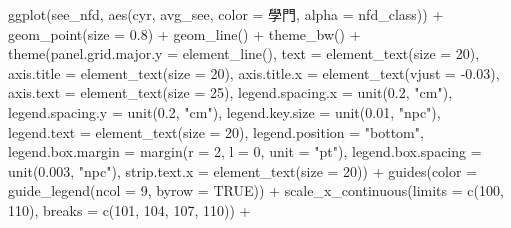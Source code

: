 \documentclass[
]{article}
\newenvironment{Shaded}{\begin{snugshade}}{\end{snugshade}}
\newcommand{\AttributeTok}[1]{\textcolor[rgb]{0.77,0.63,0.00}{#1}}
\newcommand{\ConstantTok}[1]{\textcolor[rgb]{0.00,0.00,0.00}{#1}}
\newcommand{\DecValTok}[1]{\textcolor[rgb]{0.00,0.00,0.81}{#1}}
\newcommand{\FloatTok}[1]{\textcolor[rgb]{0.00,0.00,0.81}{#1}}
\newcommand{\FunctionTok}[1]{\textcolor[rgb]{0.00,0.00,0.00}{#1}}
\newcommand{\NormalTok}[1]{#1}
\newcommand{\SpecialCharTok}[1]{\textcolor[rgb]{0.00,0.00,0.00}{#1}}
\newcommand{\StringTok}[1]{\textcolor[rgb]{0.31,0.60,0.02}{#1}}
\begin{document}
\begin{Shaded}
\begin{Highlighting}[]
  \FunctionTok{ggplot}\NormalTok{(see\_nfd, }\FunctionTok{aes}\NormalTok{(cyr, avg\_see, }\AttributeTok{color =}\NormalTok{ 學門, }\AttributeTok{alpha =}\NormalTok{ nfd\_class)) }\SpecialCharTok{+}
  \FunctionTok{geom\_point}\NormalTok{(}\AttributeTok{size =} \FloatTok{0.8}\NormalTok{) }\SpecialCharTok{+}
  \FunctionTok{geom\_line}\NormalTok{() }\SpecialCharTok{+}
  \FunctionTok{theme\_bw}\NormalTok{() }\SpecialCharTok{+}
  \FunctionTok{theme}\NormalTok{(}\AttributeTok{panel.grid.major.y =} \FunctionTok{element\_line}\NormalTok{(), }
        \AttributeTok{text =} \FunctionTok{element\_text}\NormalTok{(}\AttributeTok{size =} \DecValTok{20}\NormalTok{), }
        \AttributeTok{axis.title =} \FunctionTok{element\_text}\NormalTok{(}\AttributeTok{size =} \DecValTok{20}\NormalTok{),}
        \AttributeTok{axis.title.x =} \FunctionTok{element\_text}\NormalTok{(}\AttributeTok{vjust =} \SpecialCharTok{{-}}\FloatTok{0.03}\NormalTok{),}
        \AttributeTok{axis.text =} \FunctionTok{element\_text}\NormalTok{(}\AttributeTok{size =} \DecValTok{25}\NormalTok{),}
        \AttributeTok{legend.spacing.x =} \FunctionTok{unit}\NormalTok{(}\FloatTok{0.2}\NormalTok{, }\StringTok{"cm"}\NormalTok{),}
        \AttributeTok{legend.spacing.y =} \FunctionTok{unit}\NormalTok{(}\FloatTok{0.2}\NormalTok{, }\StringTok{"cm"}\NormalTok{),}
        \AttributeTok{legend.key.size =} \FunctionTok{unit}\NormalTok{(}\FloatTok{0.01}\NormalTok{, }\StringTok{"npc"}\NormalTok{),}
        \AttributeTok{legend.text =} \FunctionTok{element\_text}\NormalTok{(}\AttributeTok{size =} \DecValTok{20}\NormalTok{),}
        \AttributeTok{legend.position =} \StringTok{"bottom"}\NormalTok{,}
        \AttributeTok{legend.box.margin =} \FunctionTok{margin}\NormalTok{(}\AttributeTok{r =} \DecValTok{2}\NormalTok{, }\AttributeTok{l =} \DecValTok{0}\NormalTok{, }\AttributeTok{unit =} \StringTok{"pt"}\NormalTok{),}
        \AttributeTok{legend.box.spacing =} \FunctionTok{unit}\NormalTok{(}\FloatTok{0.003}\NormalTok{, }\StringTok{"npc"}\NormalTok{),}
        \AttributeTok{strip.text.x =} \FunctionTok{element\_text}\NormalTok{(}\AttributeTok{size =} \DecValTok{20}\NormalTok{)) }\SpecialCharTok{+}
  \FunctionTok{guides}\NormalTok{(}\AttributeTok{color =} \FunctionTok{guide\_legend}\NormalTok{(}\AttributeTok{ncol =} \DecValTok{9}\NormalTok{, }\AttributeTok{byrow =} \ConstantTok{TRUE}\NormalTok{)) }\SpecialCharTok{+}
  \FunctionTok{scale\_x\_continuous}\NormalTok{(}\AttributeTok{limits =} \FunctionTok{c}\NormalTok{(}\DecValTok{100}\NormalTok{, }\DecValTok{110}\NormalTok{), }\AttributeTok{breaks =} \FunctionTok{c}\NormalTok{(}\DecValTok{101}\NormalTok{, }\DecValTok{104}\NormalTok{, }\DecValTok{107}\NormalTok{, }\DecValTok{110}\NormalTok{)) }\SpecialCharTok{+}

\end{Highlighting}
\end{Shaded}
\end{document}
